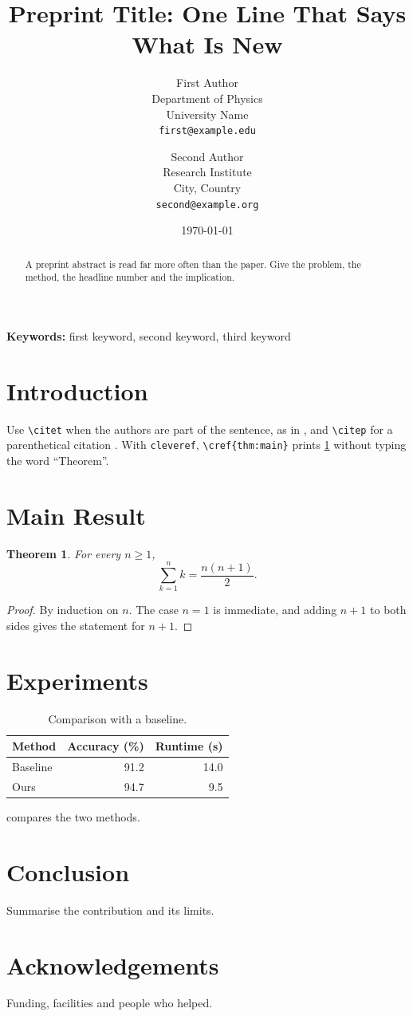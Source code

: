 \documentclass[11pt]{article}
\title{\textbf{Preprint Title: One Line That Says What Is New}}
\author{
  First Author \\ Department of Physics \\ University Name \\ \texttt{first@example.edu}
  \and
  Second Author \\ Research Institute \\ City, Country \\ \texttt{second@example.org}
}
\date{\today}
\newtheorem{theorem}{Theorem}
\begin{document}
\maketitle

\begin{abstract}
A preprint abstract is read far more often than the paper. Give the problem,
the method, the headline number and the implication.
\end{abstract}

\noindent\textbf{Keywords:} first keyword, second keyword, third keyword

\section{Introduction}

Use \verb|\citet| when the authors are part of the sentence, as in
\citet{lamport1994}, and \verb|\citep| for a parenthetical citation
\citep{einstein1905}. With \texttt{cleveref}, \verb|\cref{thm:main}| prints
\cref{thm:main} without typing the word ``Theorem''.

\section{Main Result}

\begin{theorem}\label{thm:main}
For every $n \ge 1$,
\begin{equation}
  \sum_{k=1}^{n} k = \frac{n(n+1)}{2}.
\end{equation}
\end{theorem}

\begin{proof}
By induction on $n$. The case $n = 1$ is immediate, and adding $n + 1$ to
both sides gives the statement for $n + 1$.
\end{proof}

\section{Experiments}

\begin{table}[htbp]
  \centering
  \caption{Comparison with a baseline.}
  \label{tab:comparison}
  \begin{tabular}{lrr}
    \toprule
    Method & Accuracy (\%) & Runtime (s) \\
    \midrule
    Baseline & 91.2 & 14.0 \\
    Ours     & 94.7 &  9.5 \\
    \bottomrule
  \end{tabular}
\end{table}

 compares the two methods.

\section{Conclusion}

Summarise the contribution and its limits.

\section*{Acknowledgements}
Funding, facilities and people who helped.



\end{document}
